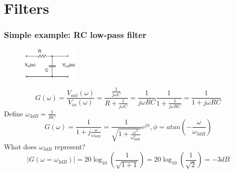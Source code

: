 \documentclass[beamer]{standalone}
\begin{document}
\section{Filters}

 
\begin{frame}
 \frametitle{Simple example: RC low-pass filter}
     \begin{figure}
      \includegraphics[width=0.25\textwidth]{./circuits/rc_low_pass.pdf}
     \end{figure}
    \[ G(\omega)
    =\frac{V_{out}(\omega)}{V_{in}(\omega)}
    = \frac{\frac{1}{j \omega C}}{R+\frac{1}{j \omega C}} 
    = \frac{1}{j \omega R C} \frac{1}{1+\frac{1}{j \omega R C}}
    = \frac{1}{1+j \omega R C}
    \]
    Define $\omega_{3dB}=\frac{1}{RC}$
    \[ G(\omega)
    = \frac{1}{1+j\frac{\omega}{\omega_{3dB}}}
    = \frac{1}{\sqrt{1+\frac{\omega^2}{\omega_{3dB}^2}}} e^{j \phi} ,
    \phi = atan (-\frac{\omega}{\omega_{3dB}})
    \]
    What does $\omega_{3dB}$ represent?
    \[
    |G(\omega=\omega_{3dB})|=20 \log_{10}\left(\frac{1}{\sqrt{1+1}}\right)
    =20 \log_{10}\left(\frac{1}{\sqrt{2}}\right)=-3 dB
    \]
\end{frame}
\end{document}
